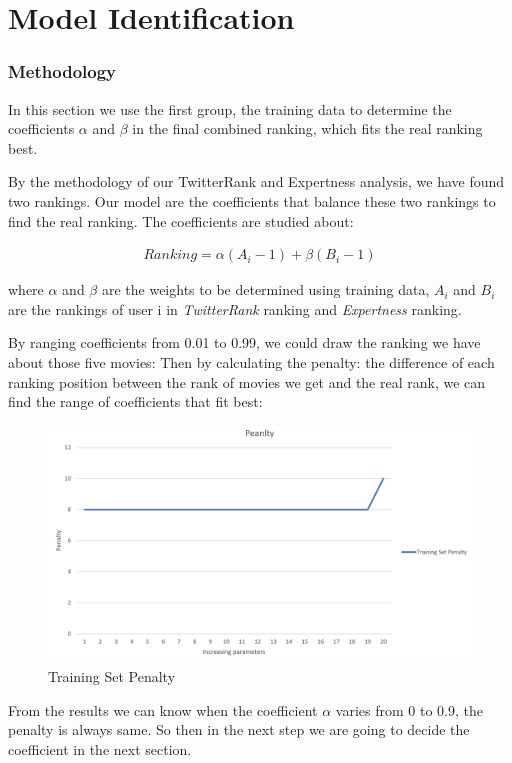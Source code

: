 \documentclass[conference]{IEEEtran}
\theoremstyle{definition}
\begin{document}
\section{Model Identification}
\subsubsection{Methodology}

In this section we use the first group, the training data to determine the coefficients $\alpha$ and $\beta$ in the final combined ranking, which fits the real ranking best. 

By the methodology of our TwitterRank and Expertness analysis, we have found two rankings. Our model are the coefficients that balance these two rankings to find the real ranking. The coefficients are studied about:


\begin{align}
Ranking = \alpha(A_i-1)+\beta(B_i-1)
\end{align}

where $\alpha$ and $\beta$ are the weights to be determined using training data, $A_i$ and $B_i$ are the rankings of user i in \textit{TwitterRank} ranking and \textit{Expertness} ranking. 

By ranging coefficients from 0.01 to 0.99, we could draw the ranking we have about those five movies: Then by calculating the penalty: the difference of each ranking position between the rank of movies we get and the real rank, we can find the range of coefficients that fit best:


\begin{figure}[htb] \centering
	\centerline{\includegraphics[width=0.8\linewidth]{c.png}}
	\caption{Training Set Penalty}
	\label{fig}
\end{figure}

From the results we can know when the coefficient $\alpha$ varies from 0 to 0.9, the penalty is always same. So then in the next step we are going to decide the coefficient in the next section. 
\end{document}
